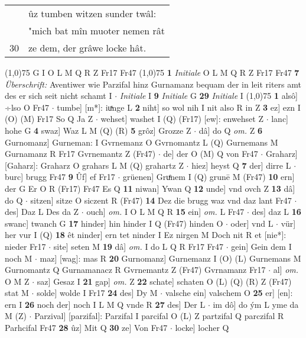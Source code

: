 \documentclass[8pt,a4paper,notitlepage]{article}
\begin{document}
\begin{table}[ht]
\begin{minipage}[t]{0.5\linewidth}
\begin{tabular}{rl}
 & ûz tumben witzen sunder twâl:\\ 
 & "mich bat mîn muoter nemen rât\\ 
30 & ze dem, der grâwe locke hât.\\ 
\end{tabular}
\scriptsize
\line(1,0){75} \newline
G I O L M Q R Z Fr17 Fr47 \newline
\line(1,0){75} \newline
\textbf{1} \textit{Initiale} O L M Q R Z Fr17 Fr47  \textbf{7} \textit{Überschrift:} Aventiwer wie Parzifal hinz Gurnamanz bequam der in leit riters amt des er sich seit nicht schamt I   $\cdot$ \textit{Initiale} I  \textbf{9} \textit{Initiale} G  \textbf{29} \textit{Initiale} I  \newline
\line(1,0){75} \newline
\textbf{1} alsô] ÷lso O Fr47  $\cdot$ tumbe] [m*]: iuͯnge L \textbf{2} niht] so wol nih I nit also R in Z \textbf{3} ez] ezn I (O) (M) Fr17 So Q Ja Z  $\cdot$ wehset] washet I (Q) (Fr17) [ew]: enwehset  Z  $\cdot$ lanc] hohe G \textbf{4} swaz] Waz L M (Q) (R) \textbf{5} grôz] Grozze Z  $\cdot$ dâ] do Q \textit{om.} Z \textbf{6} Gurnomanz] Gurneman: I Gvrnemanz O Gvrnomantz L (Q) Gurnemans M Gurnamanz R Fr17 Gvrnemantz Z (Fr47)  $\cdot$ de] der O (M) Q von Fr47  $\cdot$ Graharz] [Gaharz]: Graharz O grahars L M (Q) grahartz Z  $\cdot$ hiez] heyst Q \textbf{7} der] dirre L  $\cdot$ burc] brugg Fr47 \textbf{9} Ûf] ef Fr17  $\cdot$ grüenen] Gruͤnem I (Q) grunē M (Fr47) \textbf{10} ern] der G Er O R (Fr17) Fr47 Es Q \textbf{11} niwan] Ywan Q \textbf{12} unde] vnd ovch Z \textbf{13} dâ] do Q  $\cdot$ sitzen] sitze O siczent R (Fr47) \textbf{14} Dez die brugg waz vnd daz lant Fr47  $\cdot$ des] Daz L Des da Z  $\cdot$ ouch] \textit{om.} I O L M Q R \textbf{15} ein] \textit{om.} L Fr47  $\cdot$ des] daz L \textbf{16} swanc] twanch G \textbf{17} hinder] hin hinder I Q (Fr47) hinden O  $\cdot$ oder] vnd L  $\cdot$ vür] her vur I (Q) \textbf{18} êt ninder] ern tet ninder I Ez nirgen M Doch nit R et [nie*]: nieder Fr17  $\cdot$ site] seten M \textbf{19} dâ] \textit{om.} I do L Q R Fr17 Fr47  $\cdot$ gein] Gein dem I noch M  $\cdot$ maz] [wag]: mas R \textbf{20} Gurnomanz] Gurnemanz I (O) (L) Gurnemans M Gurnomantz Q Gurnamanacz R Gvrnemantz Z (Fr47) Gvrnamanz Fr17  $\cdot$ al] \textit{om.} O M Z  $\cdot$ saz] Gesaz I \textbf{21} gap] \textit{om.} Z \textbf{22} schate] schaten O (L) (Q) (R) Z (Fr47) stat M  $\cdot$ solde] wolde I Fr17 \textbf{24} des] Dy M  $\cdot$ valsche ein] valschem O \textbf{25} er] [en]: ern I \textbf{26} noch der] noch I L M Q vnde R \textbf{27} des] Der L  $\cdot$ im dô] do ým L yme da M (Z)  $\cdot$ Parzival] [parzifal]: Parzifal I parcifal O (L) Z partzifal Q parczifal R Parhcifal Fr47 \textbf{28} ûz] Mit Q \textbf{30} ze] Von Fr47  $\cdot$ locke] locher Q \newline

\end{minipage}
\end{table}
\end{document}
